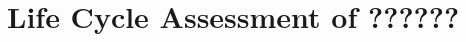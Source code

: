 \chapter{Life Cycle Assessment of ??????} %
\setlength{\parindent}{15pt}
\label{ch:life_cycl_asse}

